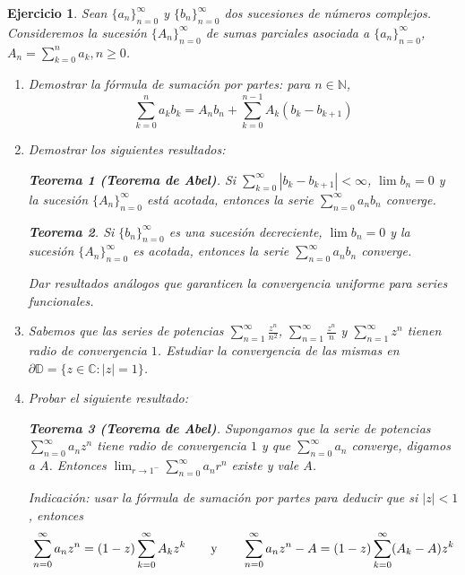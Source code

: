 \documentclass[11pt]{report}
\newcommand{\N}{\mathbb N}
\newcommand{\C}{\mathbb C}
\newcommand{\D}{\mathbb D}
\newtheorem{exercise}{Ejercicio}
\theoremstyle{remark}
\begin{document}
\begin{exercise}
Sean $\{a_n\}_{n=0}^\infty$ y $\{b_n\}_{n=0}^\infty$ dos sucesiones de números complejos. Consideremos la sucesión $\{A_n\}_{n=0}^\infty$ de sumas parciales asociada a $\{a_n\}_{n= 0}^\infty$, $A_n = \sum_{k=0}^n a_k, n \geq 0$.
\begin{enumerate}
    \item Demostrar la \itshape{fórmula de sumación por partes}: para $n \in \N$,
    \[\sum_{k=0}^n a_kb_k = A_nb_n+\sum_{k=0}^{n-1}A_k(b_k-b_{k+1})\]
    \item Demostrar los siguientes resultados:

    \textbf{Teorema 1 (\textit{Teorema de Abel})}. \textit{Si $\sum_{k=0}^\infty |b_k-b_{k+1}| < \infty$, $\lim b_n = 0$ y la sucesión $\{A_n\}_{n=0}^\infty$ está acotada, entonces la serie $\sum_{n=0}^\infty a_nb_n$ converge.}

    \textbf{Teorema 2}. \textit{Si $\{b_n\}_{n=0}^\infty$ es una sucesión decreciente, $\lim b_n=0$ y la sucesión $\{A_n\}_{n=0}^\infty$ es acotada, entonces la serie $\sum_{n=0}^\infty a_nb_n$ converge.}

    Dar resultados análogos que garanticen la convergencia uniforme para series funcionales.
    \item Sabemos que las series de potencias $\sum_{n=1}^\infty \frac{z^n}{n^2}$, $\sum_{n=1}^\infty \frac{z^n}{n}$ y $\sum_{n=1}^\infty z^n$ tienen radio de convergencia $1$. Estudiar la convergencia de las mismas en $\partial \D = \{z \in \C \colon |z|=1\}$.

    \item Probar el siguiente resultado:

    \textbf{Teorema 3 (\textit{Teorema de Abel})}. \textit{Supongamos que la serie de potencias $\sum_{n=0}^\infty a_nz^n$ tiene radio de convergencia $1$ y que $\sum_{n=0}^\infty a_n$ converge, digamos a $A$. Entonces
    $\lim_{r \to 1^-} \sum_{n=0}^\infty a_nr^n$
    existe y vale $A$.}

    \textit{Indicación}: usar la fórmula de sumación por partes para deducir que si $|z|<1$, entonces
    \[\sum_{n=0}^\infty a_nz^n = (1-z)\sum_{k=0}^\infty A_kz^k \qquad \textup{y} \qquad \sum_{n=0}^\infty a_nz^n-A=(1-z)\sum_{k=0}^\infty(A_k-A)z^k\]
\end{enumerate}
\end{exercise}
\end{document}
